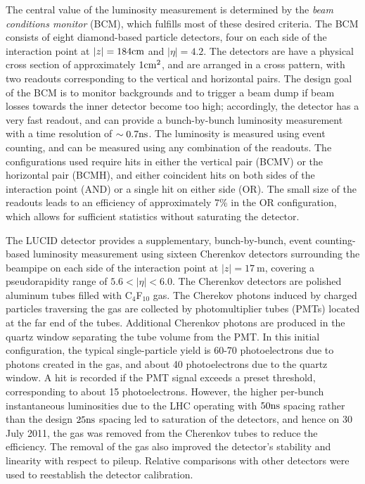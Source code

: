 The central value of the luminosity measurement is determined by the \emph{beam conditions monitor} (BCM), which fulfills most of these desired criteria. The BCM consists of eight diamond-based particle detectors, four on each side of the interaction point at $|z|=184 \mathrm{cm}$ and $|\eta|=4.2$. The detectors are have a physical cross section of approximately $1 \mathrm{cm}^2$, and are arranged in a cross pattern, with two readouts corresponding to the vertical and horizontal pairs. The design goal of the BCM is to monitor backgrounds and to trigger a beam dump if beam losses towards the inner detector become too high; accordingly, the detector has a very fast readout, and can provide a bunch-by-bunch luminosity measurement with a time resolution of $\sim 0.7 \mathrm{ns}$. The luminosity is measured using event counting, and can be measured using any combination of the readouts. The configurations used require hits in either the vertical pair (BCMV) or the horizontal pair (BCMH), and either coincident hits on both sides of the interaction point (AND) or a single hit on either side (OR). The small size of the readouts leads to an efficiency of approximately 7\% in the OR configuration, which allows for sufficient statistics without saturating the detector. 

The LUCID detector provides a supplementary, bunch-by-bunch, event counting-based luminosity measurement using sixteen Cherenkov detectors surrounding the beampipe on each side of the interaction point at $|z|=17~\mbox{m}$, covering a pseudorapidity range of $5.6<|\eta|<6.0$. The Cherenkov detectors are polished aluminum tubes filled with C$_4$F$_{10}$ gas. The Cherekov photons induced by charged particles traversing the gas are collected by photomultiplier tubes (PMTs) located at the far end of the tubes. Additional Cherenkov photons are produced in the quartz window separating the tube volume from the PMT. In this initial configuration, the typical single-particle yield is 60-70 photoelectrons due to photons created in the gas, and about 40 photoelectrons due to the quartz window. A hit is recorded if the PMT signal exceeds a preset threshold, corresponding to about 15 photoelectrons. However, the higher per-bunch instantaneous luminosities due to the LHC operating with $50 \mathrm{ns}$ spacing rather than the design $25 \mathrm{ns}$ spacing led to saturation of the detectors, and hence on 30 July 2011, the gas was removed from the Cherenkov tubes to reduce the efficiency. The removal of the gas also improved the detector's stability and linearity with respect to pileup. Relative comparisons with other detectors were used to reestablish the detector calibration.

